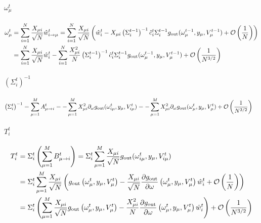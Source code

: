\documentclass[aip,jmp,amsmath,amssymb,reprint]{revtex4}
\begin{document}
\paragraph{$\omega_{\mu}^t$}
\begin{align*}
	\omega_{\mu}^t &= \sum\limits_{i = 1}^N \frac{X_{\mu i}}{\sqrt{N}}   \hat{w}_{i\to \mu}^t = \sum\limits_{i = 1}^N \frac{X_{\mu i}}{\sqrt{N}} \left(\hat{w}_{i}^t - X_{\mu i}\left(\Sigma_{i  }^{t-1}\right)^{-1}\hat{c}_{i}^t\Sigma_{i  }^{t-1}g_{\rm out} (\omega_{\mu}^{t-1}, y_{\mu}, V_{\mu}^{t-1}) + {\cal O}\left( \frac{1}{N} \right)  \right) \\
	&= \sum\limits_{i = 1}^N \frac{X_{\mu i}}{\sqrt{N}} \hat{w}_{i}^t -   \sum\limits_{i = 1}^N \frac{X_{\mu i}^2}{N} \left(\Sigma_{i  }^{t-1}\right)^{-1}\hat{c}_{i}^t\Sigma_{i  }^{t-1}g_{\rm out} (\omega_{\mu}^{t-1}, y_{\mu}, V_{\mu}^{t-1}) + {\cal O}\left( \frac{1}{N^{3/2}}\right)
\end{align*}

\paragraph{$\left(\Sigma_{i}^t\right)^{-1}$}
\begin{align*}
\left(\Sigma_{i}^t\right)^{-1} &= \sum\limits_{\mu =1}^M  A_{\mu \to i}^t
	= - \sum\limits_{\mu =1}^M X_{\mu i}^2  \partial_\omega g_{\rm out}(\omega_{i\mu}^t, y_{\mu}, V_{i\mu}^t) = - \sum\limits_{\mu =1}^M X_{\mu i}^2  \partial_\omega g_{\rm out}(\omega_{\mu}^t, y_{\mu}, V_{\mu}^t) + {\cal O}\left( \frac{1}{N^{3/2}}\right)
\end{align*}

\paragraph{$T_{i}^t$}
\begin{align*}
T_{i }^t &= \Sigma_{i}^t  \left( \sum\limits_{\mu =1}^M  B_{\mu \to i}^t \right)  =  \Sigma_{i}^t   \sum\limits_{\mu =1}^M \frac{X_{\mu i}}{\sqrt{N}} g_{\rm out} (\omega_{i\mu}^t, y_{\mu}, V_{i\mu}^t)\\
&= \Sigma_{i}^t   \sum\limits_{\mu =1}^M \frac{X_{\mu i}}{\sqrt{N}} \left(  g_{\rm out} \left(\omega_{\mu}^t , y_{\mu}, V_{\mu}^t \right)-\frac{X_{\mu i}}{\sqrt{N}}\frac{\partial g_{\rm out} }{ \partial \omega}\left(\omega_{\mu}^t , y_{\mu}, V_{\mu}^t \right)   \hat{w}_{i}^t +{\cal O}\left( \frac{1}{N}\right) \right)\\
&= \Sigma_{i}^t \left(  \sum\limits_{\mu =1}^M \frac{X_{\mu i}}{\sqrt{N}} g_{\rm out} \left(\omega_{\mu}^t , y_{\mu}, V_{\mu}^t \right)  -\frac{X_{\mu i}^2}{N} \frac{\partial g_{\rm out} }{ \partial \omega}\left(\omega_{\mu}^t , y_{\mu}, V_{\mu}^t \right)   \hat{w}_{i}^t \right) + {\cal O}\left( \frac{1}{N^{3/2}}\right)
\end{align*}
\end{document}
